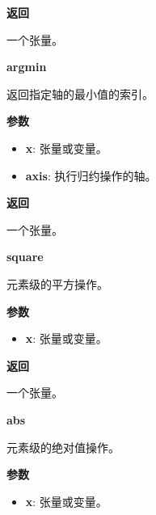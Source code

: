 \textbf{返回}

一个张量。


\textbf{argmin}\label{argmin}

\begin{Shaded}
\begin{Highlighting}[]
\OperatorTok{=-}\NormalTok{)}
\end{Highlighting}
\end{Shaded}

返回指定轴的最小值的索引。

\textbf{参数}

\begin{itemize}
\tightlist
\item
  \textbf{x}: 张量或变量。
\item
  \textbf{axis}: 执行归约操作的轴。
\end{itemize}

\textbf{返回}

一个张量。


\textbf{square}\label{square}

\begin{Shaded}
\begin{Highlighting}[]
\end{Highlighting}
\end{Shaded}

元素级的平方操作。

\textbf{参数}

\begin{itemize}
\tightlist
\item
  \textbf{x}: 张量或变量。
\end{itemize}

\textbf{返回}

一个张量。


\textbf{abs}\label{abs}

\begin{Shaded}
\begin{Highlighting}[]
\end{Highlighting}
\end{Shaded}

元素级的绝对值操作。

\textbf{参数}

\begin{itemize}
\tightlist
\item
  \textbf{x}: 张量或变量。
\end{itemize}

